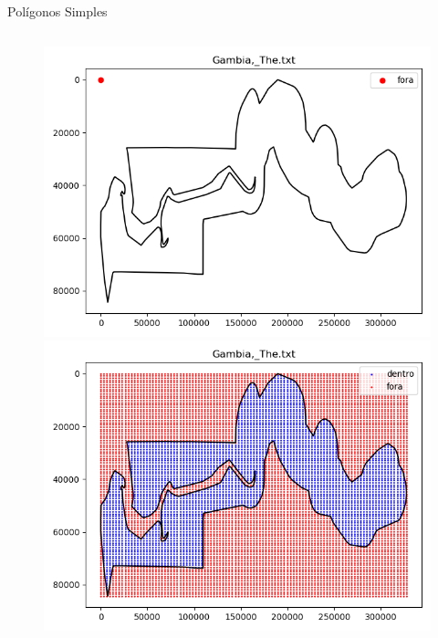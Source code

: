 \documentclass[aspectratio=169,usenames,dvipsnames]{beamer}
\begin{document}
\begin{frame}{Polígonos Simples}
\begin{columns}
\begin{center}
\begin{figure}
\begin{overprint}
        \includegraphics[width=1.0\textwidth]{figures/Gambia.png}
        \includegraphics[width=1.0\textwidth]{figures/Gambia_grid.png}
        \end{overprint}
      \end{figure}
    \end{center}
  \end{columns}
\end{frame}
\end{document}
